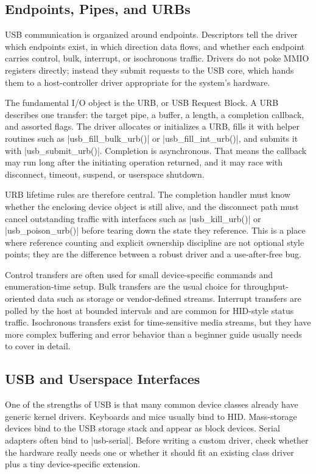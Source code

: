\documentclass[10pt, oneside]{book}
\begin{document}
\subsection{Endpoints, Pipes, and URBs}
\label{sec:usb_urbs}
USB communication is organized around endpoints.
Descriptors tell the driver which endpoints exist, in which direction data
flows, and whether each endpoint carries control, bulk, interrupt, or
isochronous traffic.
Drivers do not poke MMIO registers directly; instead they submit requests to the
USB core, which hands them to a host-controller driver appropriate for the
system's hardware.

The fundamental I/O object is the URB, or USB Request Block.
A URB describes one transfer: the target pipe, a buffer, a length, a completion
callback, and assorted flags.
The driver allocates or initializes a URB, fills it with helper routines such as
\cpp|usb_fill_bulk_urb()| or \cpp|usb_fill_int_urb()|, and submits it with
\cpp|usb_submit_urb()|.
Completion is asynchronous.
That means the callback may run long after the initiating operation returned,
and it may race with disconnect, timeout, suspend, or userspace shutdown.

URB lifetime rules are therefore central.
The completion handler must know whether the enclosing device object is still
alive, and the disconnect path must cancel outstanding traffic with interfaces
such as \cpp|usb_kill_urb()| or \cpp|usb_poison_urb()| before tearing down the
state they reference.
This is a place where reference counting and explicit ownership discipline are
not optional style points; they are the difference between a robust driver and a
use-after-free bug.

Control transfers are often used for small device-specific commands and
enumeration-time setup.
Bulk transfers are the usual choice for throughput-oriented data such as storage
or vendor-defined streams.
Interrupt transfers are polled by the host at bounded intervals and are common
for HID-style status traffic.
Isochronous transfers exist for time-sensitive media streams, but they have more
complex buffering and error behavior than a beginner guide usually needs to
cover in detail.

\subsection{USB and Userspace Interfaces}
\label{sec:usb_userspace}
One of the strengths of USB is that many common device classes already have
generic kernel drivers.
Keyboards and mice usually bind to HID.
Mass-storage devices bind to the USB storage stack and appear as block devices.
Serial adapters often bind to \cpp|usb-serial|.
Before writing a custom driver, check whether the hardware really needs one or
whether it should fit an existing class driver plus a tiny device-specific
extension.
\end{document}
